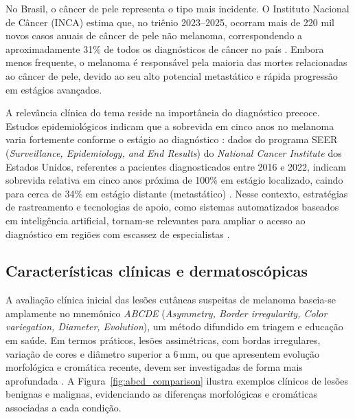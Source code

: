 No Brasil, o câncer de pele representa o tipo mais incidente. O Instituto Nacional de Câncer (INCA) estima que, no triênio 2023–2025, ocorram mais de 220 mil novos casos anuais de câncer de pele não melanoma, correspondendo a aproximadamente 31\% de todos os diagnósticos de câncer no país \cite{inca2023estimativa}. Embora menos frequente, o melanoma é responsável pela maioria das mortes relacionadas ao câncer de pele, devido ao seu alto potencial metastático e rápida progressão em estágios avançados.

A relevância clínica do tema reside na importância do diagnóstico precoce. Estudos epidemiológicos indicam que a sobrevida em cinco anos no melanoma varia fortemente conforme o estágio ao diagnóstico \cite{garbe2009melanoma}: dados do programa SEER (\textit{Surveillance, Epidemiology, and End Results}) do \textit{National Cancer Institute} dos Estados Unidos, referentes a pacientes diagnosticados entre 2016 e 2022, indicam sobrevida relativa em cinco anos próxima de 100\% em estágio localizado, caindo para cerca de 34\% em estágio distante (metastático) \cite{nci2026seermelanoma}. Nesse contexto, estratégias de rastreamento e tecnologias de apoio, como sistemas automatizados baseados em inteligência artificial, tornam-se relevantes para ampliar o acesso ao diagnóstico em regiões com escassez de especialistas \cite{jain2021development,giavinabianchi2020teledermatology}.


\subsection{Características clínicas e dermatoscópicas}

A avaliação clínica inicial das lesões cutâneas suspeitas de melanoma baseia-se amplamente no mnemônico \textit{ABCDE} (\textit{Asymmetry, Border irregularity, Color variegation, Diameter, Evolution}), um método difundido em triagem e educação em saúde. Em termos práticos, lesões assimétricas, com bordas irregulares, variação de cores e diâmetro superior a 6\,mm, ou que apresentem evolução morfológica e cromática recente, devem ser investigadas de forma mais aprofundada \cite{abbasi2004early}. A Figura~\ref{fig:abcd_comparison} ilustra exemplos clínicos de lesões benignas e malignas, evidenciando as diferenças morfológicas e cromáticas associadas a cada condição.

